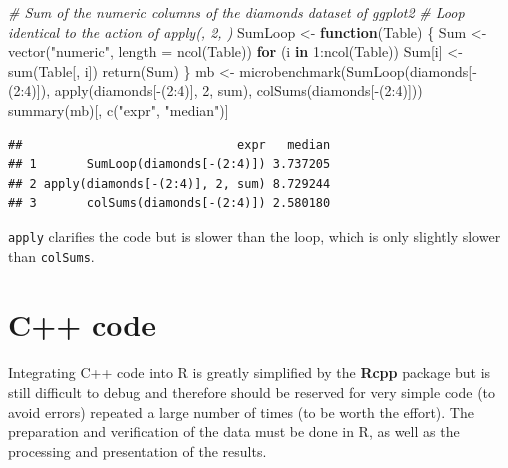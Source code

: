 \documentclass[
  12pt,
  american,
  a4paper,
  extrafontsizes,onecolumn,openright
  ]{memoir}
\newenvironment{Shaded}{\begin{snugshade}}{\end{snugshade}}
\newcommand{\AttributeTok}[1]{\textcolor[rgb]{0.77,0.63,0.00}{#1}}
\newcommand{\CommentTok}[1]{\textcolor[rgb]{0.56,0.35,0.01}{\textit{#1}}}
\newcommand{\ControlFlowTok}[1]{\textcolor[rgb]{0.13,0.29,0.53}{\textbf{#1}}}
\newcommand{\DecValTok}[1]{\textcolor[rgb]{0.00,0.00,0.81}{#1}}
\newcommand{\FunctionTok}[1]{\textcolor[rgb]{0.00,0.00,0.00}{#1}}
\newcommand{\NormalTok}[1]{#1}
\newcommand{\OtherTok}[1]{\textcolor[rgb]{0.56,0.35,0.01}{#1}}
\newcommand{\SpecialCharTok}[1]{\textcolor[rgb]{0.00,0.00,0.00}{#1}}
\newcommand{\StringTok}[1]{\textcolor[rgb]{0.31,0.60,0.02}{#1}}
\begin{document}
\begin{Shaded}
\begin{Highlighting}[]
\CommentTok{\# Sum of the numeric columns of the diamonds dataset of ggplot2}
\CommentTok{\# Loop identical to the action of apply(, 2, )}
\NormalTok{SumLoop }\OtherTok{\textless{}{-}} \ControlFlowTok{function}\NormalTok{(Table) \{}
\NormalTok{  Sum }\OtherTok{\textless{}{-}} \FunctionTok{vector}\NormalTok{(}\StringTok{"numeric"}\NormalTok{, }\AttributeTok{length =} \FunctionTok{ncol}\NormalTok{(Table))}
  \ControlFlowTok{for}\NormalTok{ (i }\ControlFlowTok{in} \DecValTok{1}\SpecialCharTok{:}\FunctionTok{ncol}\NormalTok{(Table)) Sum[i] }\OtherTok{\textless{}{-}} \FunctionTok{sum}\NormalTok{(Table[, i])}
  \FunctionTok{return}\NormalTok{(Sum)}
\NormalTok{\}}
\NormalTok{mb }\OtherTok{\textless{}{-}} \FunctionTok{microbenchmark}\NormalTok{(}\FunctionTok{SumLoop}\NormalTok{(diamonds[}\SpecialCharTok{{-}}\NormalTok{(}\DecValTok{2}\SpecialCharTok{:}\DecValTok{4}\NormalTok{)]), }
                     \FunctionTok{apply}\NormalTok{(diamonds[}\SpecialCharTok{{-}}\NormalTok{(}\DecValTok{2}\SpecialCharTok{:}\DecValTok{4}\NormalTok{)], }\DecValTok{2}\NormalTok{, sum), }
                     \FunctionTok{colSums}\NormalTok{(diamonds[}\SpecialCharTok{{-}}\NormalTok{(}\DecValTok{2}\SpecialCharTok{:}\DecValTok{4}\NormalTok{)]))}
\FunctionTok{summary}\NormalTok{(mb)[, }\FunctionTok{c}\NormalTok{(}\StringTok{"expr"}\NormalTok{, }\StringTok{"median"}\NormalTok{)]}
\end{Highlighting}
\end{Shaded}

\begin{verbatim}
##                              expr   median
## 1       SumLoop(diamonds[-(2:4)]) 3.737205
## 2 apply(diamonds[-(2:4)], 2, sum) 8.729244
## 3       colSums(diamonds[-(2:4)]) 2.580180
\end{verbatim}

\normalsize

\texttt{apply} clarifies the code but is slower than the loop, which is only slightly slower than \texttt{colSums}.

\hypertarget{sec:cpp}{%
\section{C++ code}\label{sec:cpp}}

Integrating C++ code into R is greatly simplified by the \textbf{Rcpp} package but is still difficult to debug and therefore should be reserved for very simple code (to avoid errors) repeated a large number of times (to be worth the effort).
The preparation and verification of the data must be done in R, as well as the processing and presentation of the results.
\end{document}
